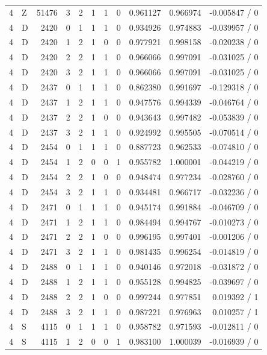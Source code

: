 \begin{longtable}{@{}rlrrlrrrrrr@{}}
4 & Z & 51476 & 3 & 2 & 1 & 1 & 0 & 0.961127 & 0.966974 & -0.005847 / 0 \\
4 & D & 2420 & 0 & 1 & 1 & 1 & 0 & 0.934926 & 0.974883 & -0.039957 / 0 \\
4 & D & 2420 & 1 & 2 & 1 & 0 & 0 & 0.977921 & 0.998158 & -0.020238 / 0 \\
4 & D & 2420 & 2 & 2 & 1 & 1 & 0 & 0.966066 & 0.997091 & -0.031025 / 0 \\
4 & D & 2420 & 3 & 2 & 1 & 1 & 0 & 0.966066 & 0.997091 & -0.031025 / 0 \\
4 & D & 2437 & 0 & 1 & 1 & 1 & 0 & 0.862380 & 0.991697 & -0.129318 / 0 \\
4 & D & 2437 & 1 & 2 & 1 & 1 & 0 & 0.947576 & 0.994339 & -0.046764 / 0 \\
4 & D & 2437 & 2 & 2 & 1 & 0 & 0 & 0.943643 & 0.997482 & -0.053839 / 0 \\
4 & D & 2437 & 3 & 2 & 1 & 1 & 0 & 0.924992 & 0.995505 & -0.070514 / 0 \\
4 & D & 2454 & 0 & 1 & 1 & 1 & 0 & 0.887723 & 0.962533 & -0.074810 / 0 \\
4 & D & 2454 & 1 & 2 & 0 & 0 & 1 & 0.955782 & 1.000001 & -0.044219 / 0 \\
4 & D & 2454 & 2 & 2 & 1 & 0 & 0 & 0.948474 & 0.977234 & -0.028760 / 0 \\
4 & D & 2454 & 3 & 2 & 1 & 1 & 0 & 0.934481 & 0.966717 & -0.032236 / 0 \\
4 & D & 2471 & 0 & 1 & 1 & 1 & 0 & 0.945174 & 0.991884 & -0.046709 / 0 \\
4 & D & 2471 & 1 & 2 & 1 & 1 & 0 & 0.984494 & 0.994767 & -0.010273 / 0 \\
4 & D & 2471 & 2 & 2 & 1 & 0 & 0 & 0.996195 & 0.997401 & -0.001206 / 0 \\
4 & D & 2471 & 3 & 2 & 1 & 1 & 0 & 0.981435 & 0.996254 & -0.014819 / 0 \\
4 & D & 2488 & 0 & 1 & 1 & 1 & 0 & 0.940146 & 0.972018 & -0.031872 / 0 \\
4 & D & 2488 & 1 & 2 & 1 & 1 & 0 & 0.955128 & 0.994825 & -0.039697 / 0 \\
4 & D & 2488 & 2 & 2 & 1 & 0 & 0 & 0.997244 & 0.977851 & 0.019392 / 1 \\
4 & D & 2488 & 3 & 2 & 1 & 1 & 0 & 0.987221 & 0.976963 & 0.010257 / 1 \\
4 & S & 4115 & 0 & 1 & 1 & 1 & 0 & 0.958782 & 0.971593 & -0.012811 / 0 \\
4 & S & 4115 & 1 & 2 & 0 & 0 & 1 & 0.983100 & 1.000039 & -0.016939 / 0 \\

\end{longtable}
